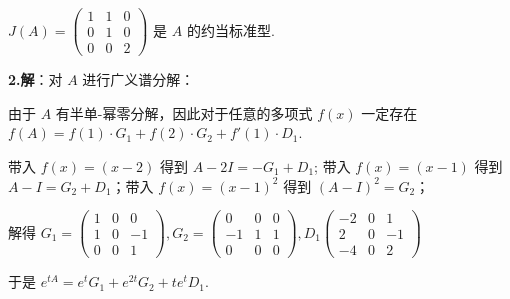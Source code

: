 \documentclass{article}
\begin{document}
$J(A)=\begin{pmatrix}
	1 & 1 & 0\\
	0 & 1 & 0\\
	0 & 0 & 2
\end{pmatrix}$ 是 $A$ 的约当标准型.

\par \textbf{2.解}：对 $A$ 进行广义谱分解：

由于 $A$ 有半单-幂零分解，因此对于任意的多项式 $f(x)$ 一定存在 $f(A)=f(1)\cdot G_1 + f(2)\cdot G_2 + f'(1) \cdot D_1$.

带入 $f(x)=(x-2)$ 得到 $A-2I=- G_1+D_1$; 带入 $f(x)=(x-1)$ 得到 $A-I=G_2+D_1$；带入 $f(x)=(x-1)^2$ 得到 $(A-I)^2=G_2$；

解得 $G_1=\begin{pmatrix}
	1 & 0 & 0\\
	1 & 0 & -1\\
	0 & 0 & 1
\end{pmatrix}, G_2=\begin{pmatrix}
	0 & 0 & 0\\
	-1 & 1 & 1\\
	0 & 0 & 0
\end{pmatrix}, D_1\begin{pmatrix}
	-2 & 0 & 1\\
	2 & 0 & -1\\
	-4 & 0 & 2
\end{pmatrix}$

于是 $e^{tA}=e^tG_1+e^{2t}G_2+te^{t}D_1$.
\end{document}
